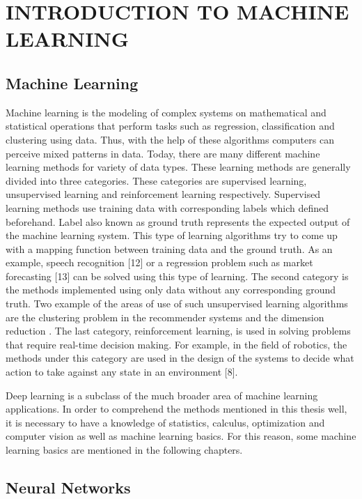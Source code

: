 \chapter{INTRODUCTION TO MACHINE LEARNING }\label{intro_to_ml}

\section{Machine Learning}

Machine learning is the modeling of complex systems on mathematical and statistical operations that perform tasks such as regression, classification and clustering using data. Thus, with the help of these algorithms computers can perceive mixed patterns in data. Today, there are many different machine learning methods for variety of data types. These learning methods are generally divided into three categories. These categories are supervised learning, unsupervised learning and reinforcement learning respectively. Supervised learning methods use training data with corresponding labels which defined beforehand. Label also known as ground truth represents the expected output of the machine learning system. This type of learning algorithms try to come up with a mapping function between training data and the ground truth. As an example, speech recognition [12] or a regression problem such as market forecasting [13] can be solved using this type of learning. The second category is the methods implemented using only data without any corresponding ground truth. Two example of the areas of use of such unsupervised learning algorithms are the clustering problem in the recommender systems \cite{recommender_systems} and the dimension reduction \cite{pca}. The last category, reinforcement learning, is used in solving problems that require real-time decision making. For example, in the field of robotics, the methods under this category are used in the design of the systems to decide what action to take against any state in an environment [8].

Deep learning is a subclass of the much broader area of machine learning applications. In order to comprehend the methods mentioned in this thesis well, it is necessary to have a knowledge of statistics, calculus, optimization and computer vision as well as machine learning basics. For this reason, some machine learning basics are mentioned in the following chapters.


\section{Neural Networks}

